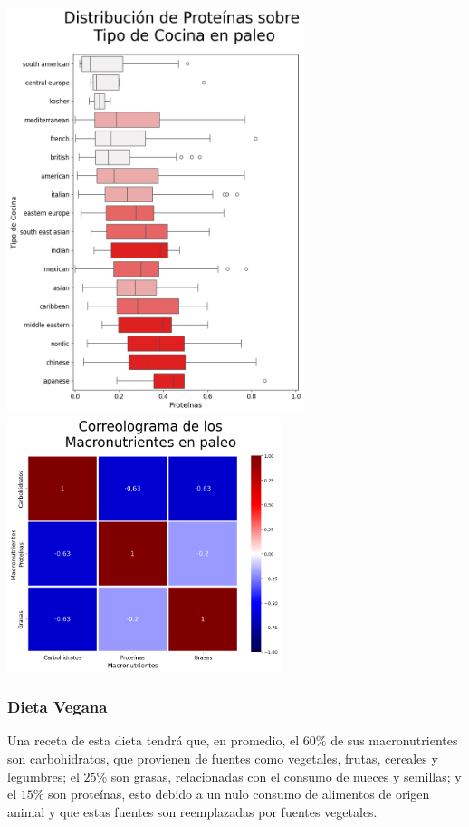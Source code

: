 \documentclass[12pt,a4paper]{article}
\begin{document}
            \begin{center}
                \includegraphics[width=0.65\textwidth]{Resources/2_03_plot_04_2.png}
                \includegraphics[width=0.6\textwidth]{Resources/2_03_plot_04_4.png}
            \end{center}

        \subsubsection{Dieta Vegana}

            Una receta de esta dieta tendrá que, en promedio, el $60\%$ de 
            sus macronutrientes son carbohidratos, que provienen de fuentes 
            como vegetales, frutas, cereales y legumbres; el $25\%$ son grasas, 
            relacionadas con el consumo de nueces y semillas; y el $15\%$ son 
            proteínas, esto debido a un nulo consumo de alimentos de origen 
            animal y que estas fuentes son reemplazadas por fuentes vegetales.\\
\end{document}
